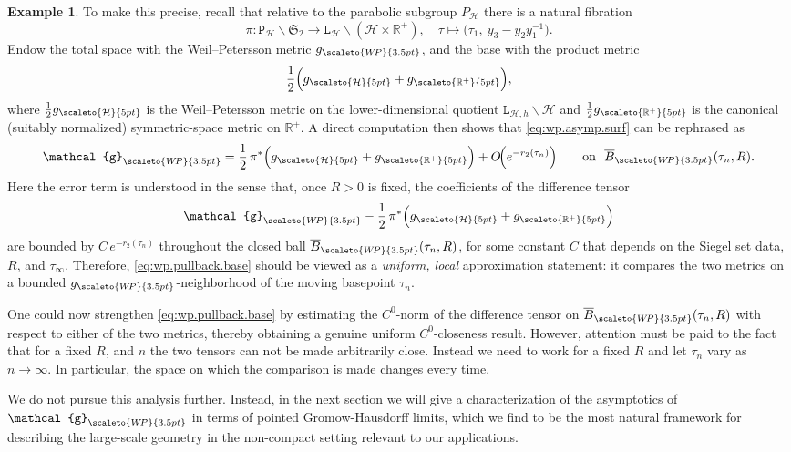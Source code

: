 \documentclass[11pt]{amsart}
\theoremstyle{plain}
\theoremstyle{definition}
\newtheorem{example}[theorem]{Example}
\theoremstyle{remark}
\newcommand{\R}{\mathbb R}
\newcommand{\fS}{\mathfrak{S}}
\newcommand{\g}{\mathcal{g}}
\newcommand{\cH}{\mathcal{H}}
\newcommand{\tP}{\mathtt{P}}
\newcommand{\tL}{\mathtt{L}}
\newcommand{\WP}{\scaleto{W\!P}{3.5pt}}
\begin{document}
\begin{example}
To make this precise, recall that relative to the parabolic subgroup $P_{\cH}$ there is a natural fibration
\begin{equation}
    \label{eq:parabolic.fibration}
    \pi: \tP_{\cH}\backslash\fS_2\longrightarrow \tL_{\cH}\backslash(\cH\times \R^{+}),
    \quad
    \tau\longmapsto\bigl(\tau_1,\ y_3-y_2y_1^{-1}\bigr).
\end{equation}
Endow the total space with the Weil--Petersson metric $g_{\WP}$, and the base with the product metric
\begin{equation*}
\frac{1}{2}\Bigl(g_{\scaleto{\cH}{5pt}}+g_{\scaleto{\R^{+}}{5pt}}\Bigr),
\end{equation*}
where $\tfrac{1}{2}g_{\scaleto{\cH}{5pt}}$ is the Weil--Petersson metric on the lower-dimensional quotient
$\tL_{\cH,h}\backslash\cH$ and $\tfrac{1}{2}g_{\scaleto{\R^{+}}{5pt}}$ is the canonical (suitably normalized) symmetric-space
metric on $\R^{+}$. A direct computation then shows that \eqref{eq:wp.asymp.surf} can be rephrased as 
\begin{equation}
    \label{eq:wp.pullback.base}
    \g_{\WP}
    = \frac{1}{2}\,\pi^*\Bigl(g_{\scaleto{\cH}{5pt}}+g_{\scaleto{\R^{+}}{5pt}}\Bigr)
      + O\!\Bigl(e^{-r_2(\tau_n)}\Bigr)
    \qquad
    \text{on }\ \overline B_{\WP}(\tau_n,R).
\end{equation}
Here the error term is understood in the sense that, once $R>0$ is fixed, the coefficients of the difference tensor
\[
\g_{\WP}-\frac{1}{2}\,\pi^*\Bigl(g_{\scaleto{\cH}{5pt}}+g_{\scaleto{\R^{+}}{5pt}}\Bigr)
\]
are bounded by $C\,e^{-r_2(\tau_n)}$ throughout the closed ball $\overline B_{\WP}(\tau_n,R)$, for some constant $C$ that depends on the Siegel set data, $R$, and $\tau_\infty$. Therefore, \eqref{eq:wp.pullback.base} should be viewed as a \emph{uniform, local} approximation statement:
it compares the two metrics on a bounded $g_{\WP}$-neighborhood of the moving basepoint $\tau_n$.

One could now strengthen \eqref{eq:wp.pullback.base} by estimating the $C^0$-norm of the difference tensor on
$\overline B_{\WP}(\tau_n,R)$ with respect to either of the two metrics, thereby obtaining a genuine
uniform $C^0$-closeness result. However, attention must be paid to the fact that for a fixed $R$, and $n$ the two tensors can not be made arbitrarily close. Instead we need to work for a fixed $R$ and let $\tau_n$ vary as $n\to \infty$. In particular, the space on which the comparison is made changes every time.

We do not pursue this analysis further. Instead, in the next section we will give a characterization of the asymptotics of $\g_{\WP}$ in terms of pointed Gromow-Hausdorff limits, which we
find to be the most natural framework for describing the large-scale geometry in the non-compact setting relevant
to our applications.
\end{example}
\end{document}
